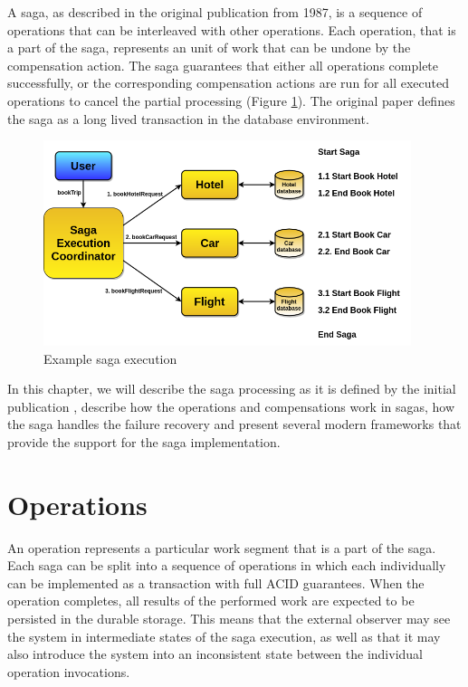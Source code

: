 \documentclass[oneside,
  digital, %
  table,   %
  lof,     %
  lot,     %
]{fithesis3}
\begin{document}
A saga, as described in the original publication \cite{sagas_publ} from 1987, is a sequence of operations that can be interleaved with other operations. Each operation, that is a part of the saga, represents an unit of work that can be undone by the compensation action. The saga guarantees that either all operations complete successfully, or the corresponding compensation actions are run for all executed operations to cancel the partial processing (Figure \ref{fig:tripExample}). The original paper \cite{sagas_publ} defines the saga as a long lived transaction in the database environment.

\begin{figure}[h]
    \begin{center}
        \includegraphics[height=60mm]{images/tripExample.png}
    \end{center}
    \caption{Example saga execution}
    \label{fig:tripExample}
\end{figure}

In this chapter, we will describe the saga processing as it is defined by the initial publication \cite{sagas_publ}, describe how the operations and compensations work in sagas, how the saga handles the failure recovery and present several modern frameworks that provide the support for the saga implementation. 

\section{Operations}

An operation represents a particular work segment that is a part of the saga. Each saga can be split into a sequence of operations in which each individually can be implemented as a transaction with full ACID guarantees. When the operation completes, all results of the performed work are expected to be persisted in the durable storage. This means that the external observer may see the system in intermediate states of the saga execution, as well as that it may also introduce the system into an inconsistent state between the individual operation invocations.
\end{document}
